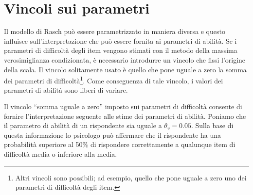 \section{Vincoli sui parametri}

Il modello di Rasch può essere parametrizzato in maniera diversa e questo influisce sull'interpretazione che può essere fornita ai parametri di abilità.
Se i parametri di difficoltà degli item vengono stimati con il metodo della massima verosimiglianza condizionata, è necessario introdurre un vincolo che fissi l'origine della scala. Il vincolo solitamente usato è quello che pone uguale a zero la somma dei parametri di difficoltà\footnote{Altri vincoli sono possibili; ad esempio, quello che pone uguale a zero uno dei parametri di difficoltà degli item.}. Come conseguenza di tale vincolo, i valori dei parametri di abilità sono liberi di variare.

Il vincolo ``somma uguale a zero'' imposto sui parametri di difficoltà consente di
fornire l'interpretazione seguente alle stime dei parametri di abilità. Poniamo che il parametro di abilità di un rispondente sia uguale a $\theta_v=0.05$. Sulla base di questa informazione lo psicologo può affermare che il rispondente ha una probabilità superiore al 50\% di rispondere correttamente a qualunque item di difficoltà media o inferiore alla media. 


